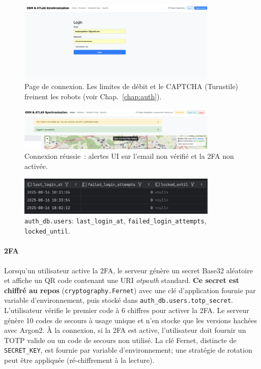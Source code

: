 \begin{figure}[H]
  \centering
  \includegraphics[width=0.85\textwidth]{../figures/chap10/login_page.png}
  \caption[Page de connexion]{Page de connexion. Les limites de débit et le CAPTCHA (Turnstile) freinent les robots (voir Chap.~\ref{chap:auth}).}
\end{figure}

\begin{figure}[H]
  \centering
  \includegraphics[width=0.85\textwidth]{../figures/chap10/login_succesful.png}
  \caption[Connexion réussie]{Connexion réussie : alertes UI sur l'email non vérifié et la 2FA non activée.}
\end{figure}

\begin{figure}[H]
  \centering
  \includegraphics[width=0.85\textwidth]{../figures/chap10/auth_db4.png}
  \caption[users — verrous]{\texttt{auth\_db.users}: \texttt{last\_login\_at}, \texttt{failed\_login\_attempts}, \texttt{locked\_until}.}
\end{figure}

\paragraph{2FA}
Lorsqu'un utilisateur active la 2FA, le serveur génère un secret Base32 aléatoire et affiche un QR code contenant une URI \textit{otpauth} standard. \textbf{Ce secret est chiffré au repos} (\texttt{cryptography.Fernet}) avec une clé d'application fournie par variable d'environnement, puis stocké dans \texttt{auth\_db.users.totp\_secret}. L'utilisateur vérifie le premier code à 6 chiffres pour activer la 2FA. Le serveur génère 10 codes de secours à usage unique et n'en stocke que les versions hachées avec Argon2. À la connexion, si la 2FA est active, l'utilisateur doit fournir un TOTP valide ou un code de secours non utilisé. La clé Fernet, distincte de \texttt{SECRET\_KEY}, est fournie par variable d'environnement; une stratégie de rotation peut être appliquée (ré-chiffrement à la lecture).

